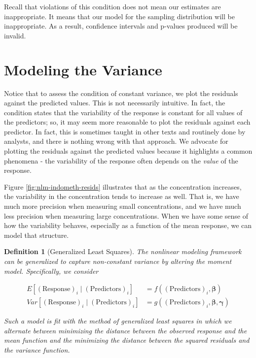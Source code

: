 \documentclass[
]{book}
\theoremstyle{plain}
\theoremstyle{mydefn}
\newtheorem{definition}{Definition}[chapter]
\theoremstyle{myexmpl}
\theoremstyle{remark}
\begin{document}
Recall that violations of this condition does not mean our estimates are inappropriate. It means that our model for the sampling distribution will be inappropriate. As a result, confidence intervals and p-values produced will be invalid.

\hypertarget{modeling-the-variance}{%
\section{Modeling the Variance}\label{modeling-the-variance}}

Notice that to assess the condition of constant variance, we plot the residuals against the predicted values. This is not necessarily intuitive. In fact, the condition states that the variability of the response is constant for all values of the predictors; so, it may seem more reasonable to plot the residuals against each predictor. In fact, this is sometimes taught in other texts and routinely done by analysts, and there is nothing wrong with that approach. We advocate for plotting the residuals against the predicted values because it highlights a common phenomena - the variability of the response often depends on the \emph{value} of the response.

Figure \ref{fig:nlm-indometh-resids} illustrates that as the concentration increases, the variability in the concentration tends to increase as well. That is, we have much more precision when measuring small concentrations, and we have much less precision when measuring large concentrations. When we have some sense of how the variability behaves, especially as a function of the mean response, we can model that structure.

\begin{definition}[Generalized Least Squares]
The nonlinear modeling framework can be generalized to capture non-constant variance by altering the moment model. Specifically, we consider

\[
\begin{aligned}
  E\left[(\text{Response})_i \mid (\text{Predictors})_i\right]
    &= f\left((\text{Predictors})_i, \boldsymbol{\beta}\right) \\
  Var\left[(\text{Response})_i \mid (\text{Predictors})_i\right]
    &= g\left((\text{Predictors})_i, \boldsymbol{\beta}, \boldsymbol{\gamma}\right)
\end{aligned}
\]

Such a model is fit with the method of generalized least squares in which we alternate between minimizing the distance between the observed response and the mean function and the minimizing the distance between the squared residuals and the variance function.
\end{definition}
\end{document}
